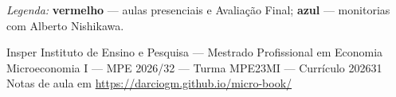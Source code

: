 \documentclass[11pt,a4paper]{article}
\begin{document}
\vspace{1em}

\begin{center}
\small
\textit{Legenda:} \textcolor{insperred}{\textbf{vermelho}} --- aulas presenciais e Avaliação Final; \textcolor{monitoriablue}{\textbf{azul}} --- monitorias com Alberto Nishikawa.
\end{center}

\vfill
\begin{center}
\small
Insper Instituto de Ensino e Pesquisa --- Mestrado Profissional em Economia \\
Microeconomia I --- MPE 2026/32 --- Turma MPE23MI --- Currículo 202631 \\
Notas de aula em \url{https://darciogm.github.io/micro-book/}
\end{center}

\end{document}
